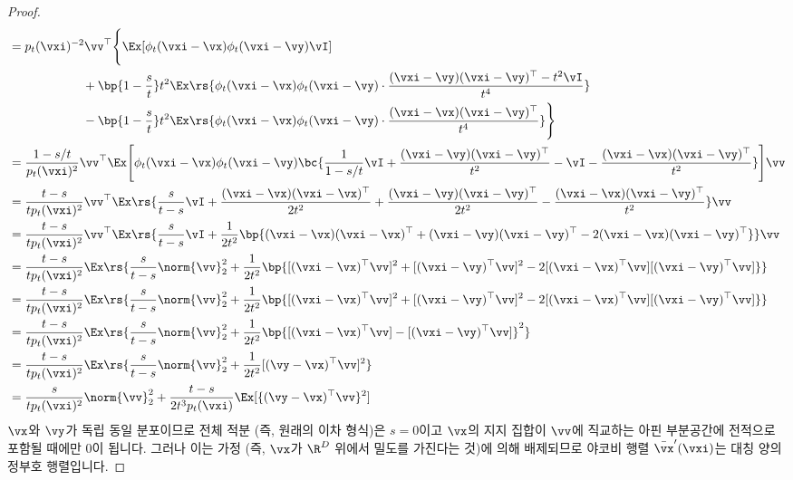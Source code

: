 \documentclass[../../book-main_ko.tex]{subfiles}
\begin{document}
\begin{proof}
\begin{align}
        &= p_{t}(\vxi)^{-2}\vv^{\top}\Bigg\{\Ex[\phi_{t}(\vxi - \vx)\phi_{t}(\vxi - \vy)\vI] \\
        & \qquad \qquad \qquad + \bp{1 - \frac{s}{t}}t^{2}\Ex\rs{\phi_{t}(\vxi - \vx)\phi_{t}(\vxi - \vy)\cdot\frac{(\vxi - \vy)(\vxi - \vy)^{\top} - t^{2}\vI}{t^{4}}} \\
        & \qquad \qquad \qquad -\bp{1 - \frac{s}{t}}t^{2}\Ex\rs{\phi_{t}(\vxi - \vx)\phi_{t}(\vxi - \vy)\cdot\frac{(\vxi - \vx)(\vxi - \vy)^{\top}}{t^{4}}}\Bigg\} \\
        &= \frac{1 - s/t}{p_{t}(\vxi)^{2}}\vv^{\top}\Ex\mathopen{}\Bigg[\phi_{t}(\vxi - \vx)\phi_{t}(\vxi - \vy)\bc{\frac{1}{1 - s/t}\vI + \frac{(\vxi - \vy)(\vxi - \vy)^{\top}}{t^{2}} - \vI - \frac{(\vxi - \vx)(\vxi - \vy)^{\top}}{t^{2}}}\Bigg]\vv \\
        &= \frac{t - s}{tp_{t}(\vxi)^{2}}\vv^{\top}\Ex\rs{\frac{s}{t - s}\vI +\frac{(\vxi - \vx)(\vxi - \vx)^{\top}}{2t^{2}} + \frac{(\vxi - \vy)(\vxi - \vy)^{\top}}{2t^{2}} - \frac{(\vxi - \vx)(\vxi - \vy)^{\top}}{t^{2}}}\vv \\
        &= \frac{t - s}{tp_{t}(\vxi)^{2}}\vv^{\top}\Ex\rs{\frac{s}{t - s}\vI +\frac{1}{2t^{2}}\bp{(\vxi - \vx)(\vxi - \vx)^{\top} + (\vxi - \vy)(\vxi - \vy)^{\top} - 2(\vxi - \vx)(\vxi - \vy)^{\top}}}\vv \\
        &= \frac{t - s}{tp_{t}(\vxi)^{2}}\Ex\rs{\frac{s}{t - s}\norm{\vv}_{2}^{2} +\frac{1}{2t^{2}}\bp{[(\vxi - \vx)^{\top}\vv]^{2} + [(\vxi - \vy)^{\top}\vv]^{2} - 2[(\vxi - \vx)^{\top}\vv][(\vxi - \vy)^{\top}\vv]}} \\
        &= \frac{t - s}{tp_{t}(\vxi)^{2}}\Ex\rs{\frac{s}{t - s}\norm{\vv}_{2}^{2} +\frac{1}{2t^{2}}\bp{[(\vxi - \vx)^{\top}\vv]^{2} + [(\vxi - \vy)^{\top}\vv]^{2} - 2[(\vxi - \vx)^{\top}\vv][(\vxi - \vy)^{\top}\vv]}} \\
        &= \frac{t - s}{tp_{t}(\vxi)^{2}}\Ex\rs{\frac{s}{t - s}\norm{\vv}_{2}^{2} +\frac{1}{2t^{2}}\bp{[(\vxi - \vx)^{\top}\vv] - [(\vxi - \vy)^{\top}\vv]}^{2}} \\
        &= \frac{t - s}{tp_{t}(\vxi)^{2}}\Ex\rs{\frac{s}{t - s}\norm{\vv}_{2}^{2} +\frac{1}{2t^{2}}[(\vy - \vx)^{\top}\vv]^{2}} \\
        &= \frac{s}{tp_{t}(\vxi)^{2}}\norm{\vv}_{2}^{2} + \frac{t - s}{2t^{3}p_{t}(\vxi)}\Ex[\{(\vy - \vx)^{\top}\vv\}^{2}]
    \end{align}
    \(\vx\)와 \(\vy\)가 독립 동일 분포이므로 전체 적분 (즉, 원래의 이차 형식)은 \(s = 0\)이고 \(\vx\)의 지지 집합이 \(\vv\)에 직교하는 아핀 부분공간에 전적으로 포함될 때에만 \(0\)이 됩니다. 그러나 이는 가정 (즉, \(\vx\)가 \(\R^{D}\) 위에서 밀도를 가진다는 것)에 의해 배제되므로 야코비 행렬 \(\bar{\vx}^{\prime}(\vxi)\)는 대칭 양의 정부호 행렬입니다.
\end{proof}
\end{document}
